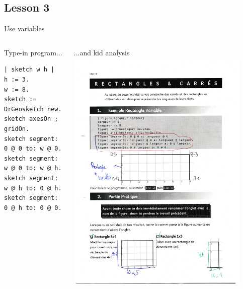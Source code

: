 \documentclass{beamer}
\begin{document}
\subsection{Lesson 3}
\begin{frame}[fragile]{Use variables}
  \begin{columns}[t]
    \vspace*{10pt}
    \begin{column}{0.5\textwidth}
      Type-in program...
      \vspace*{10pt}
      \fontsize{9pt}{8pt}\selectfont
    \begin{lstlisting}[language=Smalltalk]
| sketch w h |
h := 3.
w := 8.
sketch := DrGeosketch new.
sketch axesOn ; gridOn.
sketch segment: 0 @ 0 to: w @ 0.
sketch segment: w @ 0 to: w @ h.
sketch segment: w @ h to: 0 @ h.
sketch segment: 0 @ h to: 0 @ 0.
    \end{lstlisting}
\end{column}
\begin{column}{0.5\textwidth}
  ...and kid analysis
      \includegraphics[width=0.9\textwidth]{lesson3Analysis.png}
    \end{column}  
  \end{columns}  
\end{frame}
\end{document}
